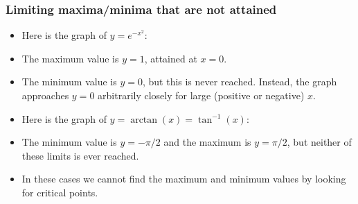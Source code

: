 \documentclass[9pt]{beamer}
\begin{document}
\begin{frame}[t]
 \frametitle{Limiting maxima/minima that are not attained}
 \begin{itemize}
  \item<1-> Here is the graph of $y=e^{-x^2}$:
   \begin{center}
   \end{center}
  \item<2-> The maximum value is $y=1$, attained at $x=0$.
  \item<3-> The minimum value is $y=0$, but this is never reached.
   Instead, the graph approaches $y=0$ arbitrarily closely for large
   (positive or negative) $x$. 
  \item<4-> Here is the graph of $y=\arctan(x)=\tan^{-1}(x)$:
   \begin{center}
   \end{center}
  \item<5-> The minimum value is $y=-\pi/2$ and the maximum is
   $y=\pi/2$, but neither of these limits is ever reached.
  \item<6-> In these cases we cannot find the maximum and minimum
   values by looking for critical points.
 \end{itemize}
\end{frame}
\end{document}
